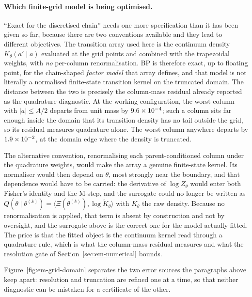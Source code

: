 \paragraph{Which finite-grid model is being optimised.} ``Exact for the
discretised chain'' needs one more specification than it has been given so far,
because there are two conventions available and they lead to different
objectives. The transition array used here is the continuum density
$K_\theta(a' \mid a)$ evaluated at the grid points and combined with the
trapezoidal weights, with \emph{no} per-column renormalisation. BP is therefore
exact, up to floating point, for the chain-shaped \emph{factor model} that
array defines, and that model is not literally a normalised finite-state
transition kernel on the truncated domain. The distance between the two is
precisely the column-mass residual already reported as the quadrature
diagnostic. At the working configuration, the worst column with $|a| \le A/2$
departs from unit mass by $9.6 \times 10^{-4}$; such a column sits far enough inside
the domain that its transition density has no tail outside the grid, so its
residual measures quadrature alone. The worst column anywhere departs by
$1.9 \times 10^{-2}$, at the domain edge where the density is truncated.

The alternative convention, renormalising each parent-conditioned column
under the quadrature weights, would make the array a genuine finite-state
kernel. Its normaliser would then depend on $\theta$, most strongly near the
boundary, and that dependence would have to be carried: the derivative of
$\log Z_\theta$ would enter both Fisher's identity and the M-step, and the
surrogate could no longer be written as
$Q(\theta \mid \theta^{(k)}) = \langle \Xi(\theta^{(k)}), \log \widetilde K_\theta\rangle$
with $K_\theta$ the raw density. Because no renormalisation is applied, that
term is absent by construction and not by oversight, and the surrogate above
is the correct one for the model actually fitted. The price is that the fitted
object is the continuum kernel read through a quadrature rule, which is what the
column-mass residual measures and what the resolution gate of
Section~\ref{sec:em-numerical} bounds.

Figure~\ref{fig:em-grid-domain} separates the two error sources the paragraphs
above keep apart: resolution and truncation are refined one at a time, so that
neither diagnostic can be mistaken for a certificate of the other.

